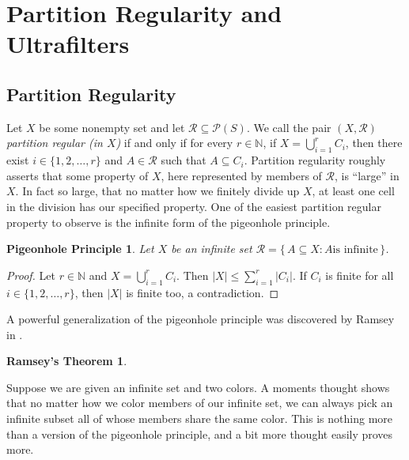 \documentclass[12pt]{article}
\theoremstyle{plain}
\newtheorem*{php}{Pigeonhole Principle}
\newtheorem*{ramsey}{Ramsey's Theorem}
\begin{document}
\section{Partition Regularity and Ultrafilters}

\newcommand{\la}{\langle}
\newcommand{\ra}{\rangle}

\newcommand{\bbN}{\mathbb{N}}

\newcommand{\calP}{\mathcal{P}}
\newcommand{\calR}{\mathcal{R}}

\subsection{Partition Regularity}
Let $X$ be some nonempty set and let $\calR \subseteq \calP(S)$.  
We call the pair $(X, \calR)$ \textsl{partition regular (in $X$)} if and
only if for every $r \in \bbN$, if $X = \bigcup_{i=1}^r C_i$, then
there exist $i \in \{1, 2, \ldots, r\}$ and $A \in \calR$ such that $A
\subseteq C_i$.
Partition regularity roughly asserts that some property of $X$, here
represented by members of $\calR$, is ``large'' in $X$.
In fact so large, that no matter how we finitely divide up $X$, at
least one cell in the division has our specified property. 
One of the easiest partition regular property to observe is the
infinite form of the pigeonhole principle.

\begin{php}
  Let $X$ be an infinite set $\calR = \{\, A \subseteq X : \mbox{$A$
    is infinite} \,\}$.
\end{php}
\begin{proof}
  Let $r \in \bbN$ and $X = \bigcup_{i=1}^r C_i$.
  Then $|X| \le \sum_{i=1}^r |C_i|$.
  If $C_i$ is finite for all $i \in \{1, 2, \ldots, r\}$,
  then $|X|$ is finite too, a contradiction.
\end{proof}

A powerful generalization of the pigeonhole principle was discovered
by Ramsey in \cite{Ramsey:1930uq}. 

\begin{ramsey}
  
\end{ramsey}

Suppose we are given an infinite set and two colors.
A moments thought shows that no matter how we color members of our
infinite set, we can always pick an infinite subset all of whose
members share the same color.
This is nothing more than a version of the pigeonhole principle, and a
bit more thought easily proves more.
\end{document}
